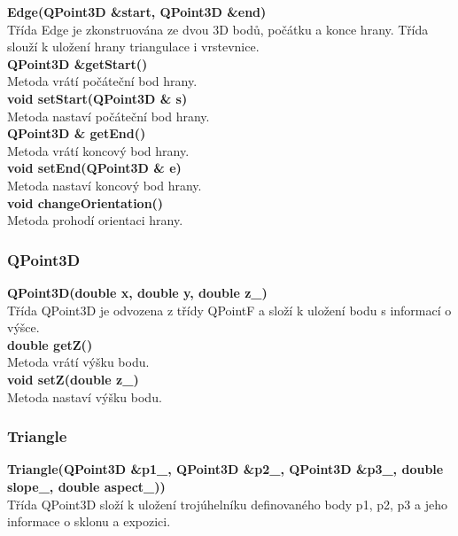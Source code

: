 \documentclass[a4paper,11pt,twoside]{article}
\begin{document}
\noindent\textbf{Edge(QPoint3D \&start, QPoint3D \&end)}\\
Třída Edge je zkonstruována ze dvou 3D bodů, počátku a konce hrany. Třída slouží k uložení hrany triangulace i vrstevnice.\\
    
\noindent\textbf{QPoint3D \&getStart()}\\
Metoda vrátí počáteční bod hrany.\\

\noindent\textbf{void setStart(QPoint3D \& s)}\\
Metoda nastaví počáteční bod hrany.\\

\noindent\textbf{QPoint3D \& getEnd()}\\
Metoda vrátí koncový bod hrany.\\

\noindent\textbf{void setEnd(QPoint3D \& e)}\\
Metoda nastaví koncový bod hrany.\\

\noindent\textbf{void changeOrientation()}\\
Metoda prohodí orientaci hrany.

\subsubsection{QPoint3D}

\noindent\textbf{QPoint3D(double x, double y, double z\_)}\\
Třída QPoint3D je odvozena z třídy QPointF a složí k uložení bodu s informací o výšce.\\

\noindent\textbf{double getZ()}\\
Metoda vrátí výšku bodu.\\

\noindent\textbf{void setZ(double z\_)}\\
Metoda nastaví výšku bodu.

\newpage
\vspace*{-1cm}
\subsubsection{Triangle}

\noindent\textbf{Triangle(QPoint3D \&p1\_, QPoint3D \&p2\_, QPoint3D \&p3\_, double slope\_, double aspect\_))}\\
Třída QPoint3D složí k uložení trojúhelníku definovaného body p1, p2, p3 a jeho informace o sklonu a expozici.\\
\end{document}
